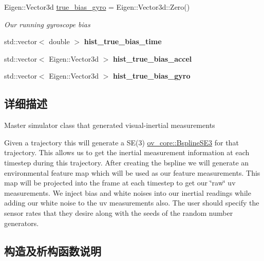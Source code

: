 \begin{DoxyCompactItemize}
Eigen\+::\+Vector3d \hyperlink{classov__init_1_1SimulatorInit_a23a46e6cdbe66968bb6d4174a1aa6861}{true\+\_\+bias\+\_\+gyro} = Eigen\+::\+Vector3d\+::\+Zero()
\begin{DoxyCompactList}\small\item\em Our running gyroscope bias \end{DoxyCompactList}\item 
\mbox{\label{classov__init_1_1SimulatorInit_aca8eeb9e14ae34664d610f7fbf86a90c}} 
std\+::vector$<$ double $>$ {\bfseries hist\+\_\+true\+\_\+bias\+\_\+time}
\item 
\mbox{\label{classov__init_1_1SimulatorInit_a96c954fefe87f0c91421fdaa09e72dd2}} 
std\+::vector$<$ Eigen\+::\+Vector3d $>$ {\bfseries hist\+\_\+true\+\_\+bias\+\_\+accel}
\item 
\mbox{\label{classov__init_1_1SimulatorInit_a34b63849cf6d4dfc3d0376ebce213e80}} 
std\+::vector$<$ Eigen\+::\+Vector3d $>$ {\bfseries hist\+\_\+true\+\_\+bias\+\_\+gyro}
\end{DoxyCompactItemize}


\subsection{详细描述}
Master simulator class that generated visual-\/inertial measurements 

Given a trajectory this will generate a S\+E(3) \hyperlink{classov__core_1_1BsplineSE3}{ov\+\_\+core\+::\+Bspline\+S\+E3} for that trajectory. This allows us to get the inertial measurement information at each timestep during this trajectory. After creating the bspline we will generate an environmental feature map which will be used as our feature measurements. This map will be projected into the frame at each timestep to get our \char`\"{}raw\char`\"{} uv measurements. We inject bias and white noises into our inertial readings while adding our white noise to the uv measurements also. The user should specify the sensor rates that they desire along with the seeds of the random number generators. 

\subsection{构造及析构函数说明}
\mbox{\label{classov__init_1_1SimulatorInit_a6f8df388f25c2d90411bd51ade48c6e4}} 
